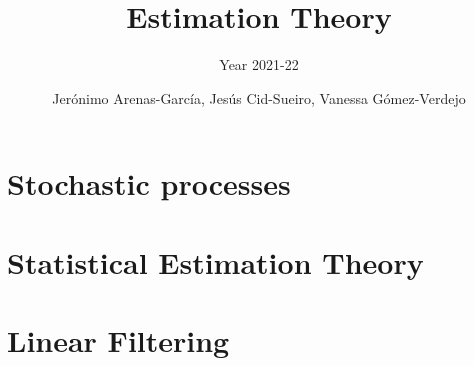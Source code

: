 \documentclass[graybox,envcountchap,sectrefs]{svmono_mod}
\begin{document}
\author{Jer\'onimo Arenas-Garc\'ia, Jes\'us Cid-Sueiro, Vanessa G\'omez-Verdejo}
\title{Estimation Theory}
\subtitle{Year 2021-22}

\frontmatter

\chapter{Stochastic processes}

\chapter{Statistical Estimation Theory}
\label{Estimation Theory}

\chapter{Linear Filtering}
\label{cha:FiltradoLinea}

\mainmatter %
\tableofcontents

%
%
%
%
%


\backmatter
\printindex
\end{document}
